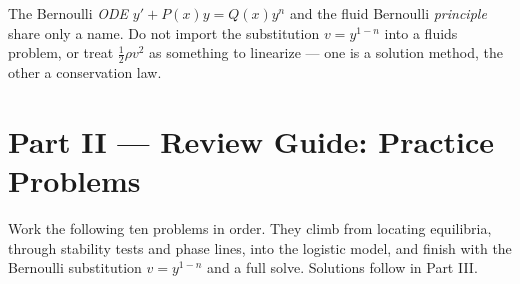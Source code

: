 \begin{warningbox}
The Bernoulli \emph{ODE} $y'+P(x)y = Q(x)y^{n}$ and the fluid Bernoulli
\emph{principle} share only a name. Do not import the substitution $v=y^{1-n}$
into a fluids problem, or treat $\tfrac{1}{2}\rho v^{2}$ as something to
linearize --- one is a solution method, the other a conservation law.
\end{warningbox}

\clearpage
{}
{}
\section*{Part II --- Review Guide: Practice Problems}

Work the following ten problems in order. They climb from locating equilibria,
through stability tests and phase lines, into the logistic model, and finish with
the Bernoulli substitution $v = y^{1-n}$ and a full solve. Solutions follow in
Part III.


